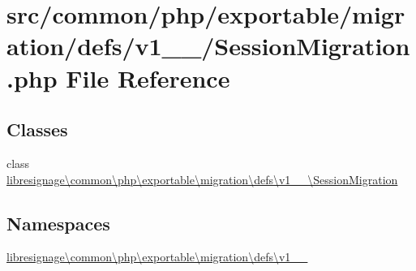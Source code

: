 \hypertarget{v1__0__0_2SessionMigration_8php}{}\section{src/common/php/exportable/migration/defs/v1\+\_\+\_/\+Session\+Migration.php File Reference}
\label{v1__0__0_2SessionMigration_8php}
\subsection*{Classes}
\begin{DoxyCompactItemize}
\item 
class \hyperlink{classlibresignage_1_1common_1_1php_1_1exportable_1_1migration_1_1defs_1_1v1__0__0_1_1SessionMigration}{libresignage\textbackslash{}common\textbackslash{}php\textbackslash{}exportable\textbackslash{}migration\textbackslash{}defs\textbackslash{}v1\+\_\+\_\textbackslash{}\+Session\+Migration}
\end{DoxyCompactItemize}
\subsection*{Namespaces}
\begin{DoxyCompactItemize}
\item 
 \hyperlink{namespacelibresignage_1_1common_1_1php_1_1exportable_1_1migration_1_1defs_1_1v1__0__0}{libresignage\textbackslash{}common\textbackslash{}php\textbackslash{}exportable\textbackslash{}migration\textbackslash{}defs\textbackslash{}v1\+\_\+\_}
\end{DoxyCompactItemize}
